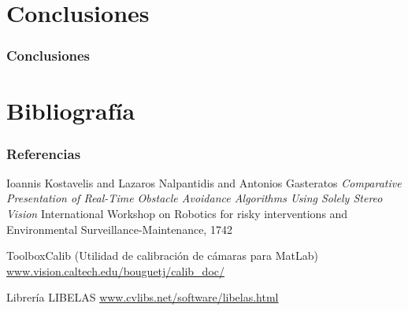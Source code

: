 \documentclass[svgnames]{beamer}
\begin{document}
\section{Conclusiones}

\begin{frame}
\frametitle{Conclusiones}


\end{frame}

\section{Bibliograf\'ia}

\begin{frame} 
\frametitle{Referencias} 

\begin{thebibliography}{10} 
\beamertemplatebookbibitems 
{}
Ioannis Kostavelis and Lazaros Nalpantidis and Antonios Gasteratos
\newblock \emph{Comparative Presentation of Real-Time Obstacle Avoidance Algorithms Using Solely Stereo Vision}
 International Workshop on Robotics for risky interventions and Environmental Surveillance-Maintenance, 1742 

ToolboxCalib (Utilidad de calibraci\'on de c\'amaras para MatLab)
\newblock \url{www.vision.caltech.edu/bouguetj/calib_doc/}


Librería LIBELAS
\url{www.cvlibs.net/software/libelas.html}

\end{thebibliography} 

\end{frame} 


\end{document}
